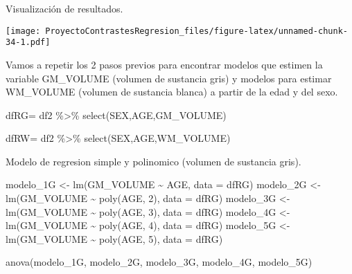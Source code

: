 \documentclass[
]{article}
\newenvironment{Shaded}{\begin{snugshade}}{\end{snugshade}}
\newcommand{\AttributeTok}[1]{\textcolor[rgb]{0.77,0.63,0.00}{#1}}
\newcommand{\DecValTok}[1]{\textcolor[rgb]{0.00,0.00,0.81}{#1}}
\newcommand{\FunctionTok}[1]{\textcolor[rgb]{0.00,0.00,0.00}{#1}}
\newcommand{\NormalTok}[1]{#1}
\newcommand{\OtherTok}[1]{\textcolor[rgb]{0.56,0.35,0.01}{#1}}
\newcommand{\SpecialCharTok}[1]{\textcolor[rgb]{0.00,0.00,0.00}{#1}}
\begin{document}
Visualización de resultados.

\begin{Shaded}
\end{Shaded}

\texttt{[image: ProyectoContrastesRegresion\_files/figure-latex/unnamed-chunk-34-1.pdf]}

Vamos a repetir los 2 pasos previos para encontrar modelos que estimen
la variable GM\_VOLUME (volumen de sustancia gris) y modelos para
estimar WM\_VOLUME (volumen de sustancia blanca) a partir de la edad y
del sexo.

\begin{Shaded}
\begin{Highlighting}[]
\NormalTok{dfRG}\OtherTok{=}\NormalTok{ df2 }\SpecialCharTok{\%\textgreater{}\%} \FunctionTok{select}\NormalTok{(SEX,AGE,GM\_VOLUME)}

\NormalTok{dfRW}\OtherTok{=}\NormalTok{ df2 }\SpecialCharTok{\%\textgreater{}\%} \FunctionTok{select}\NormalTok{(SEX,AGE,WM\_VOLUME)}
\end{Highlighting}
\end{Shaded}

Modelo de regresion simple y polinomico (volumen de sustancia gris).

\begin{Shaded}
\begin{Highlighting}[]
\NormalTok{modelo\_1G }\OtherTok{\textless{}{-}} \FunctionTok{lm}\NormalTok{(GM\_VOLUME }\SpecialCharTok{\textasciitilde{}}\NormalTok{ AGE, }\AttributeTok{data =}\NormalTok{ dfRG)}
\NormalTok{modelo\_2G }\OtherTok{\textless{}{-}} \FunctionTok{lm}\NormalTok{(GM\_VOLUME }\SpecialCharTok{\textasciitilde{}} \FunctionTok{poly}\NormalTok{(AGE, }\DecValTok{2}\NormalTok{), }\AttributeTok{data =}\NormalTok{ dfRG)}
\NormalTok{modelo\_3G }\OtherTok{\textless{}{-}} \FunctionTok{lm}\NormalTok{(GM\_VOLUME }\SpecialCharTok{\textasciitilde{}} \FunctionTok{poly}\NormalTok{(AGE, }\DecValTok{3}\NormalTok{), }\AttributeTok{data =}\NormalTok{ dfRG)}
\NormalTok{modelo\_4G }\OtherTok{\textless{}{-}} \FunctionTok{lm}\NormalTok{(GM\_VOLUME }\SpecialCharTok{\textasciitilde{}} \FunctionTok{poly}\NormalTok{(AGE, }\DecValTok{4}\NormalTok{), }\AttributeTok{data =}\NormalTok{ dfRG)}
\NormalTok{modelo\_5G }\OtherTok{\textless{}{-}} \FunctionTok{lm}\NormalTok{(GM\_VOLUME }\SpecialCharTok{\textasciitilde{}} \FunctionTok{poly}\NormalTok{(AGE, }\DecValTok{5}\NormalTok{), }\AttributeTok{data =}\NormalTok{ dfRG)}

\FunctionTok{anova}\NormalTok{(modelo\_1G, modelo\_2G, modelo\_3G, modelo\_4G, modelo\_5G)}
\end{Highlighting}
\end{Shaded}
\end{document}

